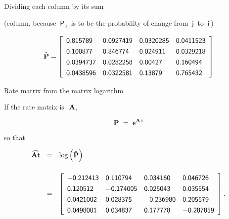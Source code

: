\documentclass[bluish,slideColor,colorBG,pdf]{prosper}
\begin{document}
\begin{slide}[Replace]{Dividing each column by its sum}

(column, because $\mathsf{~P_{ij}~}$ is to be the
probability of change from $~\mathsf{j}~$ to $~\mathsf{i}~$)

\[
\renewcommand{\arraystretch}{1.3}
\mathsf{\hat{\bf P} = \left[
\begin{array}{l l l l}
\mathsf{0.815789} & \mathsf{0.0927419} & \mathsf{0.0320285} & \mathsf{0.0411523}\\
\mathsf{0.100877} & \mathsf{0.846774} & \mathsf{0.024911} & \mathsf{0.0329218}\\
\mathsf{0.0394737} & \mathsf{0.0282258} & \mathsf{0.80427} & \mathsf{0.160494}\\
\mathsf{0.0438596} & \mathsf{0.0322581} & \mathsf{0.13879} & \mathsf{0.765432}
\end{array}
\right]
}
\]

\end{slide}

\begin{slide}[Replace]{Rate matrix from the matrix logarithm}

If the rate matrix is $~\mathsf{{\bf A}}$,

\[
\mathsf{{\bf P} \ = \ e^{{\bf A}\,t}}
\]

so that

\[
\renewcommand{\arraystretch}{1.3}
\begin{array}{c c l}
\mathsf{\widehat{{\bf A}t}} & \mathsf{=} & \mathsf{\log \left(\hat{\bf P}\right)} \\
& & \\
& \mathsf{=}  &\mathsf{\left[
\begin{array}{l l l l} 
\mathsf{-0.212413} & \mathsf{0.110794} & \mathsf{0.034160} & \mathsf{0.046726}\\
\mathsf{0.120512} & \mathsf{-0.174005} & \mathsf{0.025043} & \mathsf{0.035554}\\
\mathsf{0.0421002} & \mathsf{0.028375} & \mathsf{-0.236980} & \mathsf{0.205579}\\
\mathsf{0.0498001} & \mathsf{0.034837} & \mathsf{0.177778} & \mathsf{-0.287859}\\
\end{array} 
\right].
}
\end{array}
\]

\end{slide}
\end{document}

